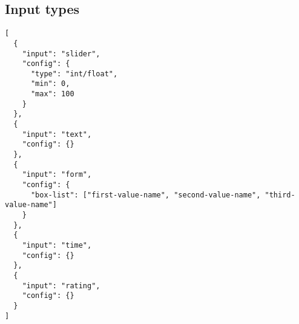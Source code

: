 \documentclass{article}
\begin{document}
\subsection{Input types}

\begin{verbatim}
[
  {
    "input": "slider",
    "config": {
      "type": "int/float",
      "min": 0,
      "max": 100
    }
  },
  {
    "input": "text",
    "config": {}
  },
  {
    "input": "form",
    "config": {
      "box-list": ["first-value-name", "second-value-name", "third-value-name"]
    }
  },
  {
    "input": "time",
    "config": {}
  },
  {
    "input": "rating",
    "config": {}
  }
]
\end{verbatim}
\end{document}
